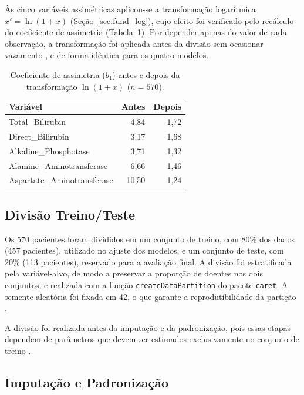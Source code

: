 Às cinco variáveis assimétricas aplicou-se a transformação logarítmica $x' = \ln(1 + x)$ \cite{logtransformation} (Seção~\ref{sec:fund_log}), cujo efeito foi verificado pelo recálculo do coeficiente de assimetria (Tabela~\ref{tab:assimetria_log}). Por depender apenas do valor de cada observação, a transformação foi aplicada antes da divisão sem ocasionar vazamento \cite{KaufmanScharRosset2012}, e de forma idêntica para os quatro modelos.

\begin{table}[htbp]
\centering
\begin{tabular}{lrr}
\hline
\textbf{Variável} & \textbf{Antes} & \textbf{Depois} \\
\hline
Total\_Bilirubin            & 4,84  & 1,72 \\
Direct\_Bilirubin           & 3,17  & 1,68 \\
Alkaline\_Phosphotase       & 3,71  & 1,32 \\
Alamine\_Aminotransferase   & 6,66  & 1,46 \\
Aspartate\_Aminotransferase & 10,50 & 1,24 \\
\hline
\end{tabular}
\caption{Coeficiente de assimetria ($b_1$) antes e depois da transformação $\ln(1+x)$ ($n = 570$).}
\label{tab:assimetria_log}
\end{table}

\subsection{Divisão Treino/Teste}
\label{sec:divisao_treino_teste}

Os 570 pacientes foram divididos em um conjunto de treino, com 80\% dos dados (457 pacientes), utilizado no ajuste dos modelos, e um conjunto de teste, com 20\% (113 pacientes), reservado para a avaliação final. A divisão foi estratificada pela variável-alvo, de modo a preservar a proporção de doentes nos dois conjuntos, e realizada com a função \texttt{createDataPartition} do pacote \texttt{caret}. A semente aleatória foi fixada em 42, o que garante a reprodutibilidade da partição \cite{Pineau2020Improving}.

A divisão foi realizada antes da imputação e da padronização, pois essas etapas dependem de parâmetros que devem ser estimados exclusivamente no conjunto de treino \cite{KaufmanScharRosset2012}.

\subsection{Imputação e Padronização}
\label{sec:padronizacao}

